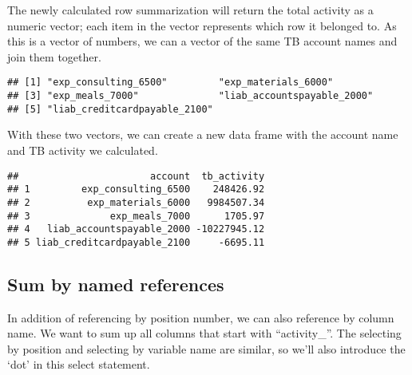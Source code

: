 \documentclass[
]{book}
\newenvironment{Shaded}{\begin{snugshade}}{\end{snugshade}}
\newcommand{\CommentTok}[1]{\textcolor[rgb]{0.56,0.35,0.01}{\textit{#1}}}
\newcommand{\DataTypeTok}[1]{\textcolor[rgb]{0.13,0.29,0.53}{#1}}
\newcommand{\KeywordTok}[1]{\textcolor[rgb]{0.13,0.29,0.53}{\textbf{#1}}}
\newcommand{\NormalTok}[1]{#1}
\newcommand{\OperatorTok}[1]{\textcolor[rgb]{0.81,0.36,0.00}{\textbf{#1}}}
\begin{document}
The newly calculated row summarization will return the total activity as a numeric vector; each item in the vector represents which row it belonged to. As this is a vector of numbers, we can a vector of the same TB account names and join them together.

\begin{Shaded}
\end{Shaded}

\begin{verbatim}
## [1] "exp_consulting_6500"         "exp_materials_6000"         
## [3] "exp_meals_7000"              "liab_accountspayable_2000"  
## [5] "liab_creditcardpayable_2100"
\end{verbatim}

With these two vectors, we can create a new data frame with the account name and TB activity we calculated.

\begin{Shaded}
\end{Shaded}

\begin{verbatim}
##                       account  tb_activity
## 1         exp_consulting_6500    248426.92
## 2          exp_materials_6000   9984507.34
## 3              exp_meals_7000      1705.97
## 4   liab_accountspayable_2000 -10227945.12
## 5 liab_creditcardpayable_2100     -6695.11
\end{verbatim}

\hypertarget{sum-by-named-references}{%
\subsection{Sum by named references}\label{sum-by-named-references}}

In addition of referencing by position number, we can also reference by column name. We want to sum up all columns that start with ``activity\_''. The selecting by position and selecting by variable name are similar, so we'll also introduce the `dot' in this select statement.
\end{document}
